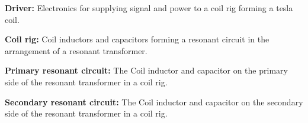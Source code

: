 \textbf{Driver:} Electronics for supplying signal and power to a coil rig forming a tesla coil.

\textbf{Coil rig:} Coil inductors and capacitors forming a resonant circuit in the arrangement of a resonant transformer.

\textbf{Primary resonant circuit:} The Coil inductor and capacitor on the primary side of the resonant transformer in a coil rig.

\textbf{Secondary resonant circuit:} The Coil inductor and capacitor on the secondary side of the resonant transformer in a coil rig.
